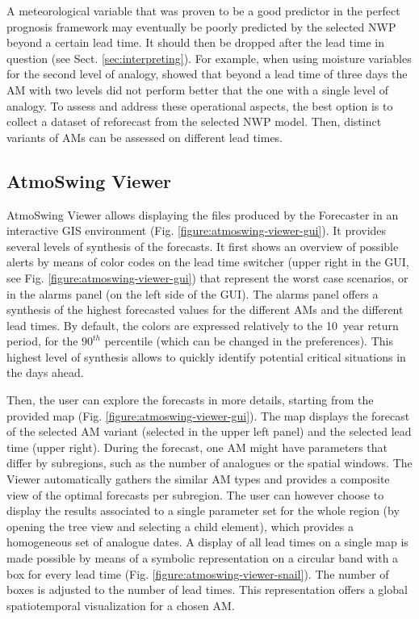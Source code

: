 \documentclass[review]{elsarticle}
\begin{document}
A meteorological variable that was proven to be a good predictor in the perfect prognosis framework may eventually be poorly predicted by the selected NWP beyond a certain lead time. It should then be dropped after the lead time in question (see Sect. \ref{sec:interpreting}). For example, when using moisture variables for the second level of analogy, \citet{Thevenot2004} showed that beyond a lead time of three days the AM with two levels did not perform better that the one with a single level of analogy. To assess and address these operational aspects, the best option is to collect a dataset of reforecast from the selected NWP model. Then, distinct variants of AMs can be assessed on different lead times. 


\subsection{AtmoSwing Viewer}
\label{sec:viewer}

AtmoSwing Viewer allows displaying the files produced by the Forecaster in an interactive GIS environment (Fig. \ref{figure:atmoswing-viewer-gui}). It provides several levels of synthesis of the forecasts. It first shows an overview of possible alerts by means of color codes on the lead time switcher (upper right in the GUI, see Fig. \ref{figure:atmoswing-viewer-gui}) that represent the worst case scenarios, or in the alarms panel (on the left side of the GUI). The alarms panel offers a synthesis of the highest forecasted values for the different AMs and the different lead times. By default, the colors are expressed relatively to the 10~year return period, for the $90^{th}$ percentile (which can be changed in the preferences). This highest level of synthesis allows to quickly identify potential critical situations in the days ahead.

Then, the user can explore the forecasts in more details, starting from the provided map (Fig. \ref{figure:atmoswing-viewer-gui}). The map displays the forecast of the selected AM variant (selected in the upper left panel) and the selected lead time (upper right). During the forecast, one AM might have parameters that differ by subregions, such as the number of analogues or the spatial windows. The Viewer automatically gathers the similar AM types and provides a composite view of the optimal forecasts per subregion. The user can however choose to display the results associated to a single parameter set for the whole region (by opening the tree view and selecting a child element), which provides a homogeneous set of analogue dates. A display of all lead times on a single map is made possible by means of a symbolic representation on a circular band with a box for every lead time (Fig. \ref{figure:atmoswing-viewer-snail}). The number of boxes is adjusted to the number of lead times. This representation offers a global spatiotemporal visualization for a chosen AM.
\end{document}
